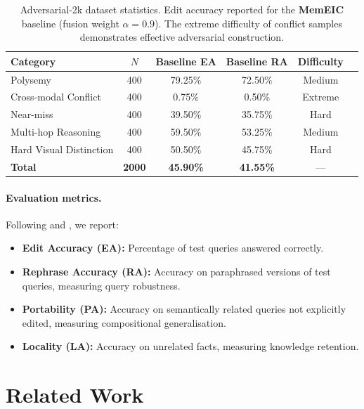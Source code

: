 \documentclass[11pt]{article}
\newcommand{\memeic}{\textbf{MemEIC}}
\begin{document}
\begin{table}[t]
\centering
\caption{Adversarial-2k dataset statistics. Edit accuracy reported for the
\memeic{} baseline (fusion weight $\alpha=0.9$). The extreme difficulty of
conflict samples demonstrates effective adversarial construction.}
\label{tab:adv2k_stats}
\small
\begin{tabular}{@{}lccccc@{}}
\toprule
\textbf{Category} & \textbf{$N$} & \textbf{Baseline EA} & \textbf{Baseline RA} & \textbf{Difficulty} \\
\midrule
Polysemy              & 400 & 79.25\% & 72.50\% & Medium \\
Cross-modal Conflict  & 400 &  0.75\% &  0.50\% & Extreme \\
Near-miss             & 400 & 39.50\% & 35.75\% & Hard \\
Multi-hop Reasoning   & 400 & 59.50\% & 53.25\% & Medium \\
Hard Visual Distinction & 400 & 50.50\% & 45.75\% & Hard \\
\midrule
\textbf{Total}        & \textbf{2000} & \textbf{45.90\%} & \textbf{41.55\%} & --- \\
\bottomrule
\end{tabular}
\end{table}

\paragraph{Evaluation metrics.}
Following \citet{memeic2025} and \citet{huang2024vlkeb}, we report:
\begin{itemize}[leftmargin=*,itemsep=1pt]
  \item \textbf{Edit Accuracy (EA):} Percentage of test queries answered correctly.
  \item \textbf{Rephrase Accuracy (RA):} Accuracy on paraphrased versions of test
    queries, measuring query robustness.
  \item \textbf{Portability (PA):} Accuracy on semantically related queries not
    explicitly edited, measuring compositional generalisation.
  \item \textbf{Locality (LA):} Accuracy on unrelated facts, measuring
    knowledge retention.
\end{itemize}

\section{Related Work}
\label{sec:related}
\end{document}
